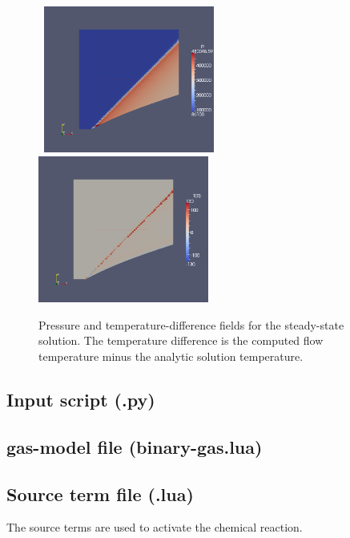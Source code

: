 \begin{figure}[htbp]
\begin{center}
\mbox{
\includegraphics[width=0.5\textwidth]{../2D/odw/odw-t9999-p.png}
\includegraphics[width=0.5\textwidth]{../2D/odw/odw-t9999-T-diff.png}
}
\end{center}
\caption{Pressure and temperature-difference fields for the steady-state solution.
   The temperature difference is the computed flow temperature minus 
   the analytic solution temperature.}
\label{odw-pressure-T-diff-fig}
\end{figure}


\newpage

\subsection{Input script (.py)}
\topbar

\bottombar

\subsection{gas-model file (binary-gas.lua)}
\topbar

\bottombar

\subsection{Source term file (.lua)}
%
The source terms are used to activate the chemical reaction.\\
\topbar

\bottombar


